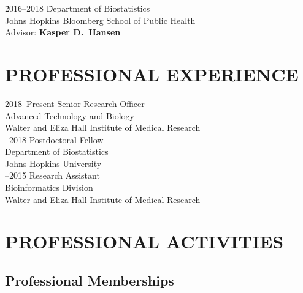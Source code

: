 \documentclass[11pt,letterpaper,pdf]{article}
\begin{document}
\begin{tabbing}
  \= 2016--2018 \hspace*{0.5cm} \= Department of Biostatistics \\
  \>\> Johns Hopkins Bloomberg School of Public Health\\
  \>\> Advisor: {\bf Kasper D.\ Hansen}
\end{tabbing}

%

\section*{PROFESSIONAL EXPERIENCE}

\begin{tabbing}
  \= 2018--Present \= Senior Research Officer\\
  \>\>Advanced Technology and Biology\\
  \>\>Walter and Eliza Hall Institute of Medical Research\\
  --2018 \> Postdoctoral Fellow\\
  \>\>Department of Biostatistics\\
  \>\> Johns Hopkins University \\
  --2015 \> Research Assistant\\
  \>\>Bioinformatics Division\\
  \>\> Walter and Eliza Hall Institute of Medical Research
\end{tabbing}

\section*{PROFESSIONAL ACTIVITIES}

\subsection*{Professional Memberships}
\end{document}
